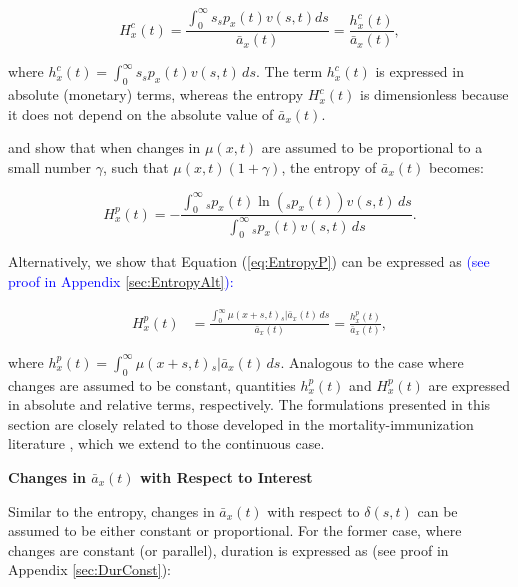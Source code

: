 \documentclass[12pt]{article}
\newcommand{\revision}[1]{\textcolor{blue}{#1}}
\begin{document}
\begin{equation}\label{eq:EntropyC}
{H}^{c}_{x}(t) = \frac{\int_{0}^\infty s {}_sp_x(t) {v}(s,t) ds}{\bar{a}_x(t)}=\frac{{h}^{c}_{x}(t)}{\bar{a}_x(t)},
\end{equation}

where ${h}^{c}_{x}(t)=\int_{0}^\infty s {}_s p_x(t) {v}(s,t) \, ds$. The term ${h}^{c}_{x}(t)$ is expressed in absolute (monetary) terms, whereas the entropy ${H}^{c}_{x}(t)$ is dimensionless because it does not depend on the absolute value of $\bar{a}_x(t)$.

\citet{Haberman2011} and \citet{Tsai2013a} show that when changes in $\mu(x,t)$ are assumed to be proportional to a small number $\gamma$, such that $\mu(x,t)(1+\gamma)$, the entropy of $\bar{a}_x(t)$ becomes:

\begin{equation} \label{eq:EntropyP}
	{H}^{p}_{x}(t) = -\frac{ \int_{0}^{\infty}{}_s p_x(t)\ln\left({}_s p_x(t)\right) {v}(s,t) \, ds}{\int_0^\infty {}_s p_x(t) {v}(s,t) \, ds}.
\end{equation}

Alternatively, we show that Equation (\ref{eq:EntropyP}) can be expressed as \revision{(see proof in Appendix \ref{sec:EntropyAlt}):}

\begin{equation} \label{eq:EntropyP2}
	\begin{split}
		{H}^{p}_{x}(t) &=  \frac{\int_0^\infty \mu(x+s,t)   {}_s|\bar{a}_x(t) \, ds}{\bar{a}_x(t)} =  \frac{{h}^{p}_{x}(t)}{\bar{a}_x(t)}, 
	\end{split}
\end{equation}

where ${h}^{p}_{x}(t)=\int_0^\infty \mu(x+s,t)   {}_s|\bar{a}_x(t) \, ds$. Analogous to the case where changes are assumed to be constant, quantities ${h}^{p}_{x}(t)$ and ${H}^{p}_{x}(t)$ are expressed in absolute and relative terms, respectively. The formulations presented in this section are closely related to those developed in the mortality-immunization literature \citep{Tsai2013a,Lin2020}, which we extend to the continuous case.



\textbf{Changes in $\bar{a}_x(t)$ with Respect to Interest}


Similar to the entropy, changes in $\bar{a}_x(t)$ with respect to $\delta(s,t)$ can be assumed to be either constant or proportional. For the former case, where changes are constant (or parallel), duration is expressed as \color{blue}(see proof in Appendix \ref{sec:DurConst})\color{black}:
\end{document}
